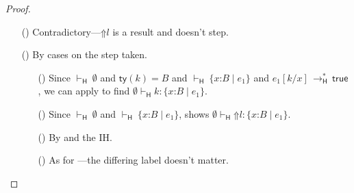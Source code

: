 \documentclass[9pt]{extarticle}
\newcommand{\ottnt}[1]{\mathit{#1}}
\newcommand{\ottsym}[1]{#1}
\begin{document}
{\begin{lemma}
\begin{proof}
{\begin{itemize}
\begin{itemize}
By Lemma~\ref{lem:heedfulmergewf}, $ \mathord{  \vdash _{  \mathsf{H}  } }~ \ottsym{(}    \mathcal{S}_{{\mathrm{1}}}  \cup  \mathcal{S}_{{\mathrm{2}}}   \cup   \set{  \ottnt{T_{{\mathrm{2}}}}  }    \ottsym{)}   \mathrel{\parallel}   \ottnt{T_{{\mathrm{1}}}}  \Rightarrow  \ottnt{T_{{\mathrm{3}}}} $. We already know that $ \emptyset   \vdash _{  \mathsf{H}  }  \ottnt{e_{{\mathrm{1}}}}  :  \ottnt{T_{{\mathrm{1}}}} $ (by
        assumption) and $ \mathord{  \vdash _{  \mathsf{H}  } }~ \ottnt{T_{{\mathrm{3}}}} $ (by inversion of the outer cast's
        typing derivation), so we can apply  to type the
        resulting merged cast.
      \item[(\E{CastRaise})] We have $ \mathord{  \vdash _{  \mathsf{H}  } }~ \ottnt{T_{{\mathrm{2}}}} $ by assumption, so we
        are done by .
      \end{itemize}
    \item[(\T{Blame})] Contradictory---$ \mathord{\Uparrow}  \ottnt{l} $ is a result and
      doesn't step.
    \item[(\T{Check})]  By cases on the step taken.
\begin{itemize}
      \item[(\E{CheckOK})] Since $ \mathord{  \vdash _{  \mathsf{H}  } }~ \emptyset $ and $ \mathsf{ty} ( \ottnt{k} )   \ottsym{=}  \ottnt{B}$
        and $ \mathord{  \vdash _{  \mathsf{H}  } }~  \{ \mathit{x} \mathord{:} \ottnt{B} \mathrel{\mid} \ottnt{e_{{\mathrm{1}}}} \}  $ and $ \ottnt{e_{{\mathrm{1}}}}  [  \ottnt{k} / \mathit{x}  ]  \,  \longrightarrow ^{*}_{  \mathsf{H}  }  \,  \mathsf{true} $, we can
        apply  to find $ \emptyset   \vdash _{  \mathsf{H}  }  \ottnt{k}  :   \{ \mathit{x} \mathord{:} \ottnt{B} \mathrel{\mid} \ottnt{e_{{\mathrm{1}}}} \}  $.
      \item[(\E{CheckFail})] Since $ \mathord{  \vdash _{  \mathsf{H}  } }~ \emptyset $ and $ \mathord{  \vdash _{  \mathsf{H}  } }~  \{ \mathit{x} \mathord{:} \ottnt{B} \mathrel{\mid} \ottnt{e_{{\mathrm{1}}}} \}  $,  shows $ \emptyset   \vdash _{  \mathsf{H}  }   \mathord{\Uparrow}  \ottnt{l}   :   \{ \mathit{x} \mathord{:} \ottnt{B} \mathrel{\mid} \ottnt{e_{{\mathrm{1}}}} \}  $.
      \item[(\E{CheckInner})] By  and the IH.
      \item[(\E{CheckRaise})] As for ---the differing
        label doesn't matter.
      \end{itemize}
    \end{itemize}
    \fi}
  \end{proof}
\end{lemma}

}
\end{document}
